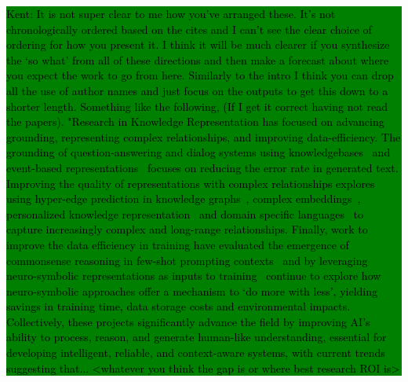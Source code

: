 \documentclass[hf]{ceurart}
\newcommand{\pinaforecomment}[4]{\colorbox{#1}{\textcolor{#4}{\parbox{.8\linewidth}{#2: #3}}}}
\newcommand{\osullikomment}[1]{\pinaforecomment{green}{Kent}{#1}{black}}
\begin{document}
\osullikomment{It is not super clear to me how you've arranged these. It's not chronologically ordered based on the cites and I can't see the clear choice of ordering for how you present it. I think it will be much clearer if you synthesize the `so what' from all of these directions and then make a forecast about where you expect the work to go from here. Similarly to the intro I think you can drop all the use of author names and just focus on the outputs to get this down to a shorter length. Something like the following, (If I get it correct having not read the papers).  "Research in Knowledge Representation has focused on advancing grounding, representing complex relationships, and improving data-efficiency. The grounding of question-answering and dialog systems using knowledgebases~\cite{Hwang2021} and event-based representations~\cite{Ismayilzada2022, Mostafazadeh2020} focuses on reducing the error rate in generated text. Improving the quality of representations with complex relationships explores using hyper-edge prediction in knowledge graphs~\cite{Chen2023}, complex embeddings~\cite{Perevalov2022}, personalized knowledge representation~\cite{Gao2023} and domain specific languages~\cite{Papoulias2023} to capture increasingly complex and long-range relationships. Finally, work to improve the data efficiency in training have evaluated the emergence of commonsense reasoning in few-shot prompting contexts~\cite{Ribeiro2021} and by leveraging neuro-symbolic representations as inputs to training~\cite{Ahmed2022} continue to explore how neuro-symbolic approaches offer a mechanism to `do more with less', yielding savings in training time, data storage costs and environmental impacts. Collectively, these projects significantly advance the field by improving AI's ability to process, reason, and generate human-like understanding, essential for developing intelligent, reliable, and context-aware systems, with current trends suggesting that... <whatever you think the gap is or where best research ROI is>}
\end{document}
